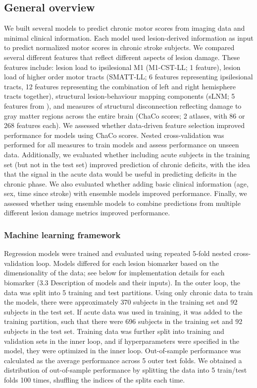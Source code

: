 \documentclass[10pt]{article}
\begin{document}
\subsection{General overview}

We built several models to predict chronic motor scores from imaging data and minimal clinical information. Each model used lesion-derived information as input to predict normalized motor scores in chronic stroke subjects. We compared several different features that reflect different aspects of lesion damage. These features include: lesion load to ipsilesional M1 (M1-CST-LL; 1 feature), lesion load of higher order motor tracts (SMATT-LL; 6 features representing ipsilesional tracts, 12 features representing the combination of left and right hemisphere tracts together), structural lesion-behaviour mapping components (sLNM; 5 features from \cite{Bowren2022-rs}), and measures of structural disconnection reflecting damage to gray matter regions across the entire brain (ChaCo scores; 2 atlases, with 86 or 268 features each). We assessed whether data-driven feature selection improved performance for models using ChaCo scores. Nested cross-validation was performed for all measures to train models and assess performance on unseen data.  Additionally, we evaluated whether including acute subjects in the training set (but not in the test set) improved prediction of chronic deficits, with the idea that the signal in the acute data would be useful in predicting deficits in the chronic phase. We also evaluated whether adding basic clinical information (age, sex, time since stroke) with ensemble models improved performance. Finally, we assessed whether using ensemble models to combine predictions from multiple different lesion damage metrics improved performance.

\subsubsection*{Machine learning framework}
Regression models were trained and evaluated using repeated 5-fold nested cross-validation loop. Models differed for each lesion biomarker based on the dimensionality of the data; see below for implementation details for each biomarker (3.3 Description of models and their inputs). In the outer loop, the data was split into 5 training and test partitions. Using only chronic data to train the models, there were approximately 370 subjects in the training set and 92 subjects in the test set. If acute data was used in training, it was added to the training partition, such that there were 696 subjects in the training set and 92 subjects in the test set. Training data was further split into training and validation sets in the inner loop, and if hyperparameters were specified in the model, they were optimized in the inner loop. Out-of-sample performance was calculated as the average performance across 5 outer test folds. We obtained a distribution of out-of-sample performance by splitting the data into 5 train/test folds 100 times, shuffling the indices of the splits each time. 
\end{document}
